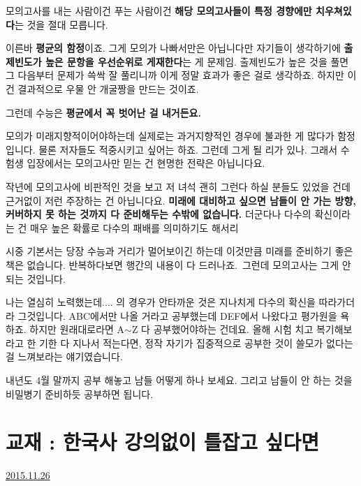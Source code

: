 \vspace{5mm}

모의고사를 내는 사람이건 푸는 사람이건
\textbf{해당 모의고사들이 특정 경향에만 치우쳐있다}는 것을 절대 모릅니다.
\vspace{5mm}

이른바 \textbf{평균의 함정}이죠. 그게 모의가 나빠서만은 아닙니다만
자기들이 생각하기에 \textbf{출제빈도가 높은 문항을 우선순위로 게재한다}는 게 문제임.
출제빈도가 높은 것을 풀면 그 다음부터 문제가 쓱싹 잘 풀리니까 이게 정말 효과가 좋은 걸로 생각하죠.
하지만 이건 결과적으로 우물 안 개굴짱을 만드는 것이죠.
\vspace{5mm}

그런데 수능은 \textbf{평균에서 꼭 벗어난 걸 내거든요.}
\vspace{5mm}

모의가 미래지향적이어야하는데 실제로는 과거지향적인 경우에 불과한 게 많다가 함정입니다.
물론 저자들도 적중시키고 싶어는 하죠. 그런데 그게 될 리가 있나.
그래서 수험생 입장에서는 모의고사만 믿는 건 현명한 전략은 아닙니다요.
\vspace{5mm}

작년에 모의고사에 비판적인 것을 보고 저 녀석 괜히 그런다 하실 분들도 있었을 건데
근거없이 저런 주장하는 건 아닙니다요.
\textbf{미래에 대비하고 싶으면 남들이 안 가는 방향, 커버하지 못 하는 것까지 다 준비해두는 수밖에 없습니다.}
더군다나 다수의 확신이라는 건 매우 높은 확률로 다수의 패배를 의미하기도 해서리
\vspace{5mm}

시중 기본서는 당장 수능과 거리가 멀어보이긴 하는데 이것만큼 미래를 준비하기 좋은 책은 없습니다.
반복하다보면 행간의 내용이 다 드러나죠. 그런데 모의고사는 그게 안 되는 것입니다.
\vspace{5mm}

나는 열심히 노력했는데.... 의 경우가 안타까운 것은 지나치게 다수의 확신을 따라가더라 그것입니다.
ABC에서만 나올 거라고 공부했는데 DEF에서 나왔다고 평가원을 욕하죠. 하지만 원래대로라면 A$\sim$Z 다 공부했어야하는 건데요.
올해 시험 치고 복기해보라고 한 기한 다 지나서 적는다면, 정작 자기가 집중적으로 공부한 것이 쓸모가 없다는 걸 느껴보라는 얘기였습니다.
\vspace{5mm}

내년도 4월 말까지 공부 해놓고 남들 어떻게 하나 보세요.
그리고 남들이 안 하는 것을 비밀병기 준비하듯 공부하면 됩니다.
\vspace{5mm}





\section{교재 : 한국사 강의없이 틀잡고 싶다면}
\href{https://www.kockoc.com/Apoc/511903}{2015.11.26}

